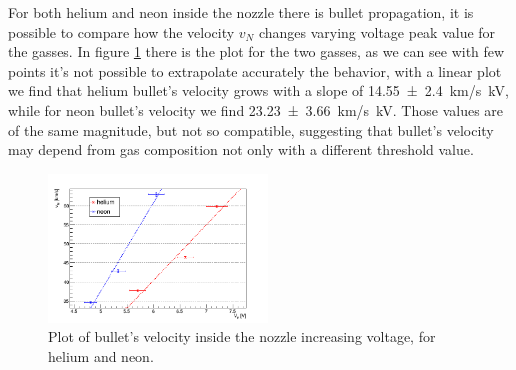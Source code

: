 For both helium and neon inside the nozzle there is bullet propagation, it is possible to compare how the velocity $v_{N}$ changes varying voltage peak value for the gasses. In figure \ref{fig:hene_d_vn} there is the plot for the two gasses, as we can see with few points it's not possible to extrapolate accurately the behavior, with a linear plot we find that helium bullet's velocity grows with a slope of \SI{14.55(240)}{\kilo\meter/\second \kilo\volt}, while for neon bullet's velocity we find \SI{23.23(366)}{\kilo\meter/\second \kilo\volt}. Those values are of the same magnitude, but not so compatible, suggesting that bullet's velocity may depend from gas composition not only with a different threshold value.
\begin{figure}
 \centering
 \includegraphics[width=0.52\textwidth]{Images/Shape/hene_vN.png}
 \caption{Plot of bullet's velocity inside the nozzle increasing voltage, for helium and neon.}
 \label{fig:hene_d_vn}
\end{figure}


